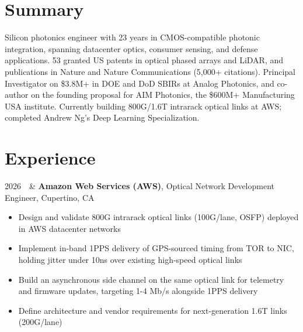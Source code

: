 \section{Summary}
Silicon photonics engineer with 23 years in CMOS-compatible photonic integration, spanning datacenter optics, consumer sensing, and defense applications. 53 granted US patents in optical phased arrays and LiDAR, and publications in Nature and Nature Communications (5,000+ citations). Principal Investigator on \$3.8M+ in DOE and DoD SBIRs at Analog Photonics, and co-author on the founding proposal for AIM Photonics, the \$600M+ Manufacturing USA institute. Currently building 800G/1.6T intrarack optical links at AWS; completed Andrew Ng's Deep Learning Specialization.%
\section{Experience}
\newenvironment{jobitems}{%
  \par\vspace{0.1em}%
  \begin{itemize}[nosep,leftmargin=1.15em,itemsep=0.2em]%
}{%
  \end{itemize}%
}
\begin{resumetabular}
2026 \,\, &
\textbf{Amazon Web Services (AWS)}, Optical Network Development Engineer, Cupertino, CA
\begin{jobitems}
  \item Design and validate 800G intrarack optical links (100G/lane, OSFP) deployed in AWS datacenter networks
  \item Implement in-band 1PPS delivery of GPS-sourced timing from TOR to NIC, holding jitter under 10ns over existing high-speed optical links
  \item Build an asynchronous side channel on the same optical link for telemetry and firmware updates, targeting 1-4 Mb/s alongside 1PPS delivery
  \item Define architecture and vendor requirements for next-generation 1.6T links (200G/lane)
\end{jobitems}
\end{resumetabular}

\vspace{0.3em}

